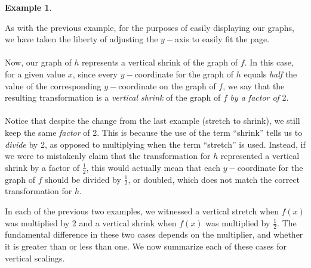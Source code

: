 \documentclass[11pt]{book}
\theoremstyle{definition}  %
\newtheorem{example}{Example}[chapter]
\begin{document}
\begin{example}
\begin{multicols}{2}
\begin{center}
\end{center} 
\end{multicols}
As with the previous example, for the purposes of easily displaying our graphs, we have taken the liberty of adjusting the $y-$axis to easily fit the page.\\
~\\
Now, our graph of $h$ represents a vertical shrink of the graph of $f$.  In this case, for a given value $x$, since every $y-$coordinate for the graph of $h$ equals \textit{half} the value of the corresponding $y-$coordinate on the graph of $f$, we say that the resulting transformation is a \textit{vertical shrink} of the graph of $f$ \textit{by a factor of} 2.\\
~\\
Notice that despite the change from the last example (stretch to shrink), we still keep the same \textit{factor} of 2.  This is because the use of the term ``shrink'' tells us to \textit{divide} by 2, as opposed to multiplying when the term ``stretch'' is used.  Instead, if we were to mistakenly claim that the transformation for $h$ represented a vertical shrink by a factor of $\frac{1}{2}$, this would actually mean that each $y-$coordinate for the graph of $f$ should be divided by $\frac{1}{2}$, or doubled, which does not match the correct transformation for $h$.
\end{example}
In each of the previous two examples, we witnessed a vertical stretch when $f(x)$ was multiplied by 2 and a vertical shrink when $f(x)$ was multiplied by $\frac{1}{2}$.  The fundamental difference in these two cases depends on the multiplier, and whether it is greater than or less than one.  We now summarize each of these cases for vertical scalings.\\
\end{document}
